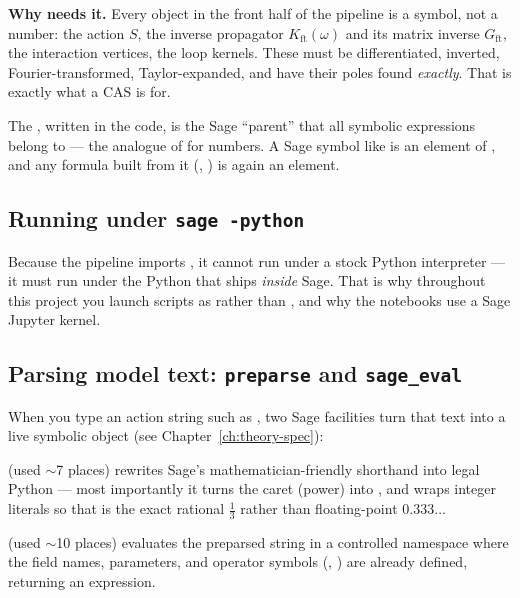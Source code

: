 \textbf{Why \Daedalus{} needs it.}  Every object in the front half of the
pipeline is a symbol, not a number: the action $S$, the inverse propagator
$K_{\mathrm{ft}}(\omega)$ and its matrix inverse $G_{\mathrm{ft}}$, the
interaction vertices, the loop kernels.  These must be differentiated, inverted,
Fourier-transformed, Taylor-expanded, and have their poles found \emph{exactly}.
That is exactly what a CAS is for.

\begin{defn}
The , written  in the code, is the Sage ``parent''
that all symbolic expressions belong to --- the analogue of  for
numbers.  A Sage symbol like  is an element of , and any
formula built from it (, ) is again an
 element.
\end{defn}

\subsection{Running under \texttt{sage -python}}
Because the pipeline imports , it cannot run under a stock Python
interpreter --- it must run under the Python that ships \emph{inside} Sage.  That
is why throughout this project you launch scripts as  rather than , and why the notebooks use a
Sage Jupyter kernel.

\subsection{Parsing model text: \texttt{preparse} and \texttt{sage\_eval}}
When you type an action string such as
,
two Sage facilities turn that text into a live symbolic object
(see Chapter~\ref{ch:theory-spec}):
\begin{description}[leftmargin=1.2em]
  \item[\code{preparse}] (used $\sim$7 places) rewrites Sage's mathematician-friendly
        shorthand into legal Python --- most importantly it turns the caret
        \code{\textasciicircum} (power) into \code{**}, and wraps integer
        literals so that  is the exact rational $\tfrac13$ rather than
        floating-point $0.333\ldots$
  \item[\code{sage\_eval}] (used $\sim$10 places) evaluates the preparsed string in a
        controlled namespace where the field names, parameters, and operator
        symbols (, ) are already defined, returning an
         expression.
\end{description}

